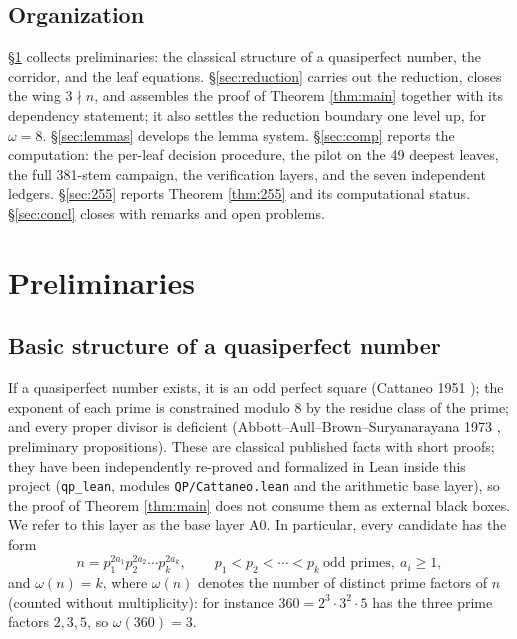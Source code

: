 \documentclass[11pt]{article}
\theoremstyle{remark}
\begin{document}
\subsection{Organization}

\S\ref{sec:prelim} collects preliminaries: the classical structure of a quasiperfect number, the corridor, and the leaf equations. \S\ref{sec:reduction} carries out the reduction, closes the wing $3 \nmid n$, and assembles the proof of Theorem \ref{thm:main} together with its dependency statement; it also settles the reduction boundary one level up, for $\omega = 8$. \S\ref{sec:lemmas} develops the lemma system. \S\ref{sec:comp} reports the computation: the per-leaf decision procedure, the pilot on the 49 deepest leaves, the full 381-stem campaign, the verification layers, and the seven independent ledgers. \S\ref{sec:255} reports Theorem \ref{thm:255} and its computational status. \S\ref{sec:concl} closes with remarks and open problems.

\section{Preliminaries}\label{sec:prelim}

\subsection{Basic structure of a quasiperfect number}\label{sec:base}

If a quasiperfect number exists, it is an odd perfect square (Cattaneo 1951 \cite{cattaneo}); the exponent of each prime is constrained modulo 8 by the residue class of the prime; and every proper divisor is deficient (Abbott--Aull--Brown--Suryanarayana 1973 \cite{abbott}, preliminary propositions). These are classical published facts with short proofs; they have been independently re-proved and formalized in Lean inside this project (\texttt{qp\_lean}, modules \texttt{QP/Cattaneo.lean} and the arithmetic base layer), so the proof of Theorem \ref{thm:main} does not consume them as external black boxes. We refer to this layer as the base layer A0. In particular, every candidate has the form
\[ n = p_1^{2a_1} p_2^{2a_2} \cdots p_k^{2a_k}, \qquad p_1 < p_2 < \cdots < p_k \ \text{odd primes},\ a_i \ge 1,
\] and $\omega(n) = k$, where $\omega(n)$ denotes the number of distinct prime factors of $n$ (counted without multiplicity): for instance $360 = 2^3 \cdot 3^2 \cdot 5$ has the three prime factors $2, 3, 5$, so $\omega(360) = 3$.
\end{document}
